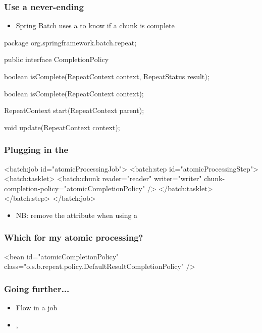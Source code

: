 \begin{frame}[fragile]
 \frametitle{Use a never-ending }
 \begin{itemize}
  \item Spring Batch uses a  to know if a chunk is complete
 \end{itemize}
\begin{javacode}
package org.springframework.batch.repeat;

public interface CompletionPolicy {

  boolean isComplete(RepeatContext context, RepeatStatus result);

  boolean isComplete(RepeatContext context);

  RepeatContext start(RepeatContext parent);

  void update(RepeatContext context);

}
\end{javacode}
\end{frame}

\begin{frame}[fragile]
 \frametitle{Plugging in the }
\begin{xmlcode}
<batch:job id="atomicProcessingJob">
  <batch:step id="atomicProcessingStep">
    <batch:tasklet>
      <batch:chunk reader="reader" writer="writer" 
                   chunk-completion-policy="atomicCompletionPolicy" />
    </batch:tasklet>
  </batch:step>
</batch:job>
\end{xmlcode}
\begin{itemize}
  \item NB: remove the  attribute when using a 
 \end{itemize}
\end{frame}

\begin{frame}[fragile]
 \frametitle{Which  for my atomic processing?}
\begin{xmlcode}
<bean id="atomicCompletionPolicy"
      class="o.s.b.repeat.policy.DefaultResultCompletionPolicy" />
\end{xmlcode}
\end{frame}

\begin{frame}
 \frametitle{Going further...}
 \begin{itemize}  
  \item Flow in a job
  \item {}, 
 \end{itemize}
\end{frame}
